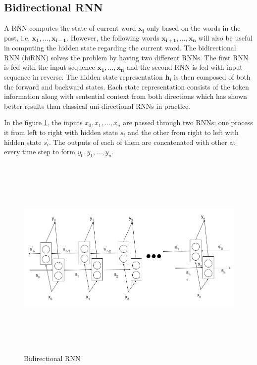 \documentclass[a4paper, 11pt]{article}
\begin{document}
\subsection{Bidirectional RNN}
A RNN computes the state of current word $\mathbf{x_{i}}$ only based on the words in the past, i.e. $\mathrm{\mathbf{x_1},\dots,\mathbf{x_{i-1}}}$. However, the following words $\mathrm{\mathbf{x_{i+1}},\dots,\mathbf{x_{n}}}$ will also be useful in computing the hidden state regarding the current word. The bidirectional RNN (biRNN) \parencite{bidirectionalRNN} solves the problem by having two different RNNs. The first RNN is fed with the input sequence $\mathrm{\mathbf{x_{1}},\dots,\mathbf{x_{n}}}$ and the second RNN is fed with input sequence in reverse. The hidden state representation $\mathbf{h_{i}}$ is then composed of both the forward and backward states. Each state representation consists of the token information along with sentential context from both directions which has shown better results than classical uni-directional RNNs in practice.

In the figure \ref{fig:bi-directional-rnn-1.png}, the inputs $x_0,x_1,\dots,x_n$  are passed through two RNNs; one process it from left to right with hidden state $s_i$ and the other from right to left with hidden state $s^{'}_i$. The outputs of each of them are concatenated with other at every time step to form $y_0,y_1,\dots,y_n$.
\begin{figure}[H]
    \centering
    \includegraphics[width=\textwidth,height=10cm,keepaspectratio=true]
    {bi-directional-rnn-1.png}
    \caption{
        Bidirectional RNN
    }
    \label{fig:bi-directional-rnn-1.png}
\end{figure}
\end{document}
